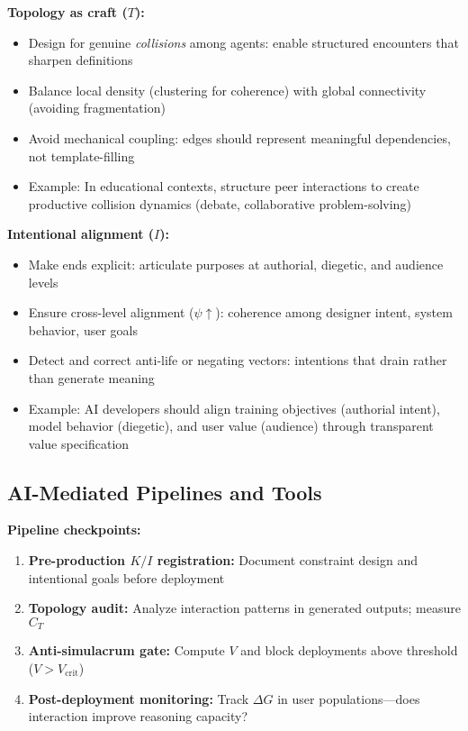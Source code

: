 \documentclass[12pt]{article}
\begin{document}
\textbf{Topology as craft ($T$):}
\begin{itemize}
\item Design for genuine \textit{collisions} among agents: enable structured encounters that sharpen definitions
\item Balance local density (clustering for coherence) with global connectivity (avoiding fragmentation)
\item Avoid mechanical coupling: edges should represent meaningful dependencies, not template-filling
\item Example: In educational contexts, structure peer interactions to create productive collision dynamics (debate, collaborative problem-solving)
\end{itemize}

\textbf{Intentional alignment ($I$):}
\begin{itemize}
\item Make ends explicit: articulate purposes at authorial, diegetic, and audience levels
\item Ensure cross-level alignment ($\psi \uparrow$): coherence among designer intent, system behavior, user goals
\item Detect and correct anti-life or negating vectors: intentions that drain rather than generate meaning
\item Example: AI developers should align training objectives (authorial intent), model behavior (diegetic), and user value (audience) through transparent value specification
\end{itemize}

\subsection{AI-Mediated Pipelines and Tools}

\textbf{Pipeline checkpoints:}
\begin{enumerate}
\item \textbf{Pre-production $K/I$ registration:} Document constraint design and intentional goals before deployment
\item \textbf{Topology audit:} Analyze interaction patterns in generated outputs; measure $C_T$
\item \textbf{Anti-simulacrum gate:} Compute $V$ and block deployments above threshold ($V > V_{\text{crit}}$)
\item \textbf{Post-deployment monitoring:} Track $\Delta G$ in user populations—does interaction improve reasoning capacity?
\end{enumerate}
\end{document}
